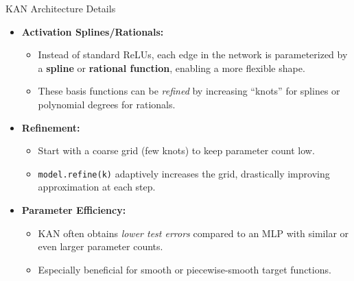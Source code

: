 \documentclass{beamer}
\begin{document}
\begin{frame}{KAN Architecture Details}
    \begin{itemize}
        \item \textbf{Activation Splines/Rationals:}
              \begin{itemize}
                  \item Instead of standard ReLUs, each edge in the network is parameterized by a \textbf{spline} or \textbf{rational function}, enabling a more flexible shape.
                  \item These basis functions can be \emph{refined} by increasing ``knots'' for splines or polynomial degrees for rationals.
              \end{itemize}
        \item \textbf{Refinement:}
              \begin{itemize}
                  \item Start with a coarse grid (few knots) to keep parameter count low.
                  \item \texttt{model.refine(k)} adaptively increases the grid, drastically improving approximation at each step.
              \end{itemize}
        \item \textbf{Parameter Efficiency:}
              \begin{itemize}
                  \item KAN often obtains \emph{lower test errors} compared to an MLP with similar or even larger parameter counts.
                  \item Especially beneficial for smooth or piecewise-smooth target functions.
              \end{itemize}
    \end{itemize}
\end{frame}

\end{document}

